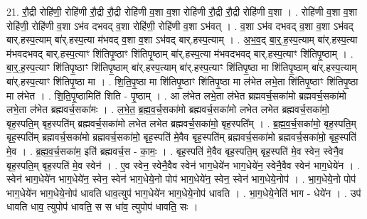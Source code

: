 \documentclass[17pt]{extarticle}
\begin{document}
21. रौ॒द्री रोहि॑णी॒ रोहि॑णी रौ॒द्री रौ॒द्री रोहि॑णी व॒शा व॒शा रोहि॑णी रौ॒द्री रौ॒द्री रोहि॑णी व॒शा । . रोहि॑णी व॒शा व॒शा रोहि॑णी॒ रोहि॑णी व॒शा ऽभ॑व दभवद् व॒शा रोहि॑णी॒ रोहि॑णी व॒शा ऽभ॑वत् । . व॒शा ऽभ॑व दभवद् व॒शा व॒शा ऽभ॑वद् बार्.हस्प॒त्याम् बा॑र्.हस्प॒त्या म॑भवद् व॒शा व॒शा ऽभ॑वद् बार्.हस्प॒त्याम् । . अ॒भ॒व॒द् बा॒र्॒.ह॒स्प॒त्याम् बा॑र्.हस्प॒त्या म॑भवदभवद् बार्.हस्प॒त्याꣳ शि॑तिपृ॒ष्ठाꣳ शि॑तिपृ॒ष्ठाम् बा॑र्.हस्प॒त्या म॑भवदभवद् बार्.हस्प॒त्याꣳ शि॑तिपृ॒ष्ठाम् । . बा॒र्॒.ह॒स्प॒त्याꣳ शि॑तिपृ॒ष्ठाꣳ शि॑तिपृ॒ष्ठाम् बा॑र्.हस्प॒त्याम् बा॑र्.हस्प॒त्याꣳ शि॑तिपृ॒ष्ठा मा शि॑तिपृ॒ष्ठाम् बा॑र्.हस्प॒त्याम् बा॑र्.हस्प॒त्याꣳ शि॑तिपृ॒ष्ठा मा । . शि॒ति॒पृ॒ष्ठा मा शि॑तिपृ॒ष्ठाꣳ शि॑तिपृ॒ष्ठा मा ल॑भेत लभे॒ता शि॑तिपृ॒ष्ठाꣳ शि॑तिपृ॒ष्ठा मा ल॑भेत । . शि॒ति॒पृ॒ष्ठामिति॑ शिति - पृ॒ष्ठाम् । . आ ल॑भेत लभे॒ता ल॑भेत ब्रह्मवर्च॒सका॑मो ब्रह्मवर्च॒सका॑मो लभे॒ता ल॑भेत ब्रह्मवर्च॒सका॑मः । . ल॒भे॒त॒ ब्र॒ह्म॒व॒र्च॒सका॑मो ब्रह्मवर्च॒सका॑मो लभेत लभेत ब्रह्मवर्च॒सका॑मो॒ बृह॒स्पति॒म् बृह॒स्पति॑म् ब्रह्मवर्च॒सका॑मो लभेत लभेत ब्रह्मवर्च॒सका॑मो॒ बृह॒स्पति᳚म् । . ब्र॒ह्म॒व॒र्च॒सका॑मो॒ बृह॒स्पति॒म् बृह॒स्पति॑म् ब्रह्मवर्च॒सका॑मो ब्रह्मवर्च॒सका॑मो॒ बृह॒स्पति॑ मे॒वैव बृह॒स्पति॑म् ब्रह्मवर्च॒सका॑मो ब्रह्मवर्च॒सका॑मो॒ बृह॒स्पति॑ मे॒व । . ब्र॒ह्म॒व॒र्च॒सका॑म॒ इति॑ ब्रह्मवर्च॒स - का॒मः॒ । . बृह॒स्पति॑ मे॒वैव बृह॒स्पति॒म् बृह॒स्पति॑ मे॒व स्वेन॒ स्वेनै॒व बृह॒स्पति॒म् बृह॒स्पति॑ मे॒व स्वेन॑ । . ए॒व स्वेन॒ स्वेनै॒वैव स्वेन॑ भाग॒धेये॑न भाग॒धेये॑न॒ स्वेनै॒वैव स्वेन॑ भाग॒धेये॑न । . स्वेन॑ भाग॒धेये॑न भाग॒धेये॑न॒ स्वेन॒ स्वेन॑ भाग॒धेये॒नो पोप॑ भाग॒धेये॑न॒ स्वेन॒ स्वेन॑ भाग॒धेये॒नोप॑ । . भा॒ग॒धेये॒नो पोप॑ भाग॒धेये॑न भाग॒धेये॒नोप॑ धावति धाव॒त्युप॑ भाग॒धेये॑न भाग॒धेये॒नोप॑ धावति । . भा॒ग॒धेये॒नेति॑ भाग - धेये॑न । . उप॑ धावति धाव॒ त्युपोप॑ धावति॒ स स धा॑व॒ त्युपोप॑ धावति॒ सः । \newline
\end{document}
